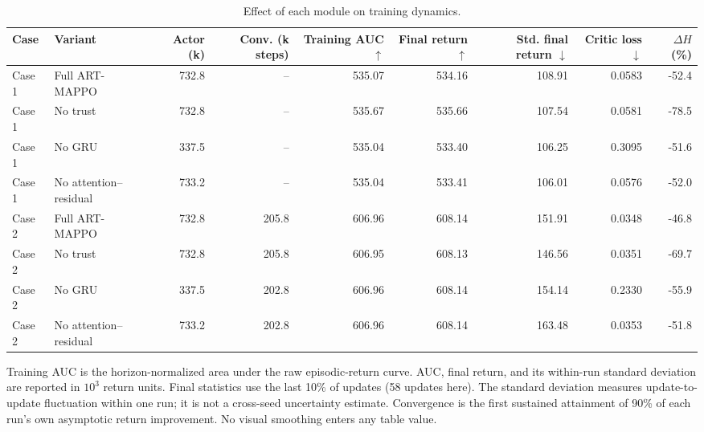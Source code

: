 \begin{table}[!t]
\centering
\small
\caption{Effect of each module on training dynamics.}
\label{tab:ablation_training_effects}
\renewcommand{\arraystretch}{1.12}
\begin{tabular}{llrrrrrrr}
\toprule
Case & Variant & Actor (k) & Conv. (k steps) & Training AUC $\uparrow$ & Final return $\uparrow$ & Std. final return $\downarrow$ & Critic loss $\downarrow$ & $\Delta H$ (\%) \\
\midrule
Case 1 & Full ART-MAPPO & 732.8 & -- & 535.07 & 534.16 & 108.91 & 0.0583 & -52.4 \\
Case 1 & No trust & 732.8 & -- & 535.67 & 535.66 & 107.54 & 0.0581 & -78.5 \\
Case 1 & No GRU & 337.5 & -- & 535.04 & 533.40 & 106.25 & 0.3095 & -51.6 \\
Case 1 & No attention--residual & 733.2 & -- & 535.04 & 533.41 & 106.01 & 0.0576 & -52.0 \\
Case 2 & Full ART-MAPPO & 732.8 & 205.8 & 606.96 & 608.14 & 151.91 & 0.0348 & -46.8 \\
Case 2 & No trust & 732.8 & 205.8 & 606.95 & 608.13 & 146.56 & 0.0351 & -69.7 \\
Case 2 & No GRU & 337.5 & 202.8 & 606.96 & 608.14 & 154.14 & 0.2330 & -55.9 \\
Case 2 & No attention--residual & 733.2 & 202.8 & 606.96 & 608.14 & 163.48 & 0.0353 & -51.8 \\
\bottomrule
\end{tabular}
\vspace{1mm}\parbox{0.98\linewidth}{\footnotesize Training AUC is the horizon-normalized area under the raw episodic-return curve. AUC, final return, and its within-run standard deviation are reported in $10^3$ return units. Final statistics use the last 10\% of updates (58 updates here). The standard deviation measures update-to-update fluctuation within one run; it is not a cross-seed uncertainty estimate. Convergence is the first sustained attainment of 90\% of each run's own asymptotic return improvement. No visual smoothing enters any table value.}
\end{table}
